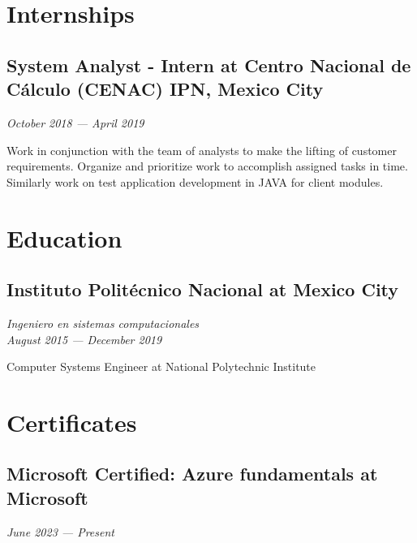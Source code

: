 \documentclass[11pt,a4paper]{article}
\begin{document}
\newpage

\section*{\color{orange}Internships}

\subsection*{System Analyst - Intern at Centro Nacional de Cálculo (CENAC) IPN, Mexico City}
\textit{October 2018 --- April 2019}

Work in conjunction with the team of analysts to make the lifting of customer requirements. Organize and prioritize work to accomplish assigned tasks in time. Similarly work on test application development in JAVA for client modules.

\vspace{0.3cm}

\section*{\color{orange}Education}

\subsection*{Instituto Politécnico Nacional at Mexico City}
\textit{Ingeniero en sistemas computacionales}\\
\textit{August 2015 --- December 2019}

Computer Systems Engineer at National Polytechnic Institute

\vspace{0.3cm}

\section*{\color{orange}Certificates}

\subsection*{Microsoft Certified: Azure fundamentals at Microsoft}
\textit{June 2023 --- Present}
\end{document}
